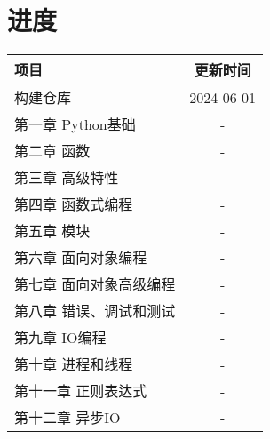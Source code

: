 \documentclass[a4paper,12pt]{article}
\begin{document}
    \section{进度}
        \begin{table}
        \centering
            \begin{tabular}{lc}
                项目                    &   更新时间 \\
                \hline
                构建仓库                &   2024-06-01 \\
                第一章 Python基础       &   - \\
                第二章 函数             &   - \\
                第三章 高级特性         &   - \\
                第四章 函数式编程       &   - \\
                第五章 模块            &   - \\
                第六章 面向对象编程     &   - \\
                第七章 面向对象高级编程 &   - \\
                第八章 错误、调试和测试 &   - \\
                第九章 IO编程          &   - \\
                第十章 进程和线程      &   - \\
                第十一章 正则表达式    &   - \\
                第十二章 异步IO        &   - \\
            \end{tabular}
        \end{table}
\end{document}
